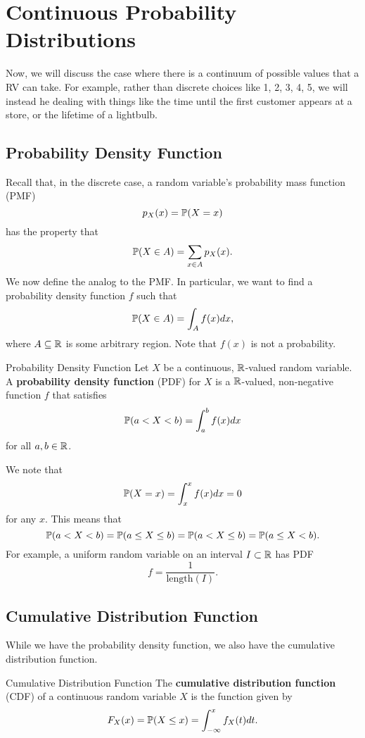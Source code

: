\section{Continuous Probability Distributions}
Now, we will discuss the case where there is a continuum of possible values that a RV can take. For example, rather than discrete choices like 1, 2, 3, 4, 5, we will instead he dealing with things like the time until the first customer appears at a store, or the lifetime of a lightbulb.

\subsection{Probability Density Function}
Recall that, in the discrete case, a random variable's probability mass function (PMF)
\[p_{X}(x) = \mathbb{P}(X = x)\]
has the property that 
\[\mathbb{P}(X \in A) = \sum_{x \in A} p_{X}(x).\]
We now define the analog to the PMF. In particular, we want to find a probability density function $f$ such that 
\[\mathbb{P}(X \in A) = \int_{A} f(x) dx,\]
where $A \subseteq \mathbb{R}$ is some arbitrary region. Note that $f(x)$ is not a probability. 

\begin{definition}{Probability Density Function}{}
    Let $X$ be a continuous, $\mathbb{R}$-valued random variable. A \textbf{probability density function} (PDF) for $X$ is a $\mathbb{R}$-valued, non-negative function $f$ that satisfies 
    \[\mathbb{P}(a < X < b) = \int_{a}^{b} f(x) dx\]
    for all $a, b \in \mathbb{R}$.
\end{definition}
We note that 
\[\mathbb{P}(X = x) = \int_{x}^{x} f(x) dx = 0\]
for any $x$. This means that 
\[\mathbb{P}(a < X < b) = \mathbb{P}(a \leq X \leq b) = \mathbb{P}(a < X \leq b) = \mathbb{P}(a \leq X < b).\]
For example, a uniform random variable on an interval $I \subset \mathbb{R}$ has PDF 
\[\boxed{f = \frac{1}{\text{length}(I)}}.\]


\subsection{Cumulative Distribution Function}
While we have the probability density function, we also have the cumulative distribution function.
\begin{definition}{Cumulative Distribution Function}{}
    The \textbf{cumulative distribution function} (CDF) of a continuous random variable $X$ is the function given by 
    \[F_{X}(x) = \mathbb{P}(X \leq x) = \int_{-\infty}^{x} f_{X}(t) dt.\]
\end{definition}

